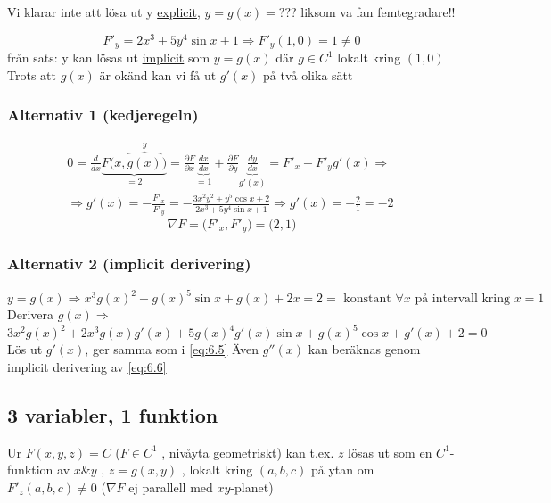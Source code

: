 \documentclass{article}
\begin{document}
Vi klarar inte att lösa ut y \underline{explicit}, \(y = g(x) = ???\) liksom va fan femtegradare!!

\[F'_y = 2x^3 + 5y^4\sin{x} + 1 \Rightarrow F'_y(1,0) = 1 \neq 0\]
från sats: y kan lösas ut \underline{implicit} som \(y = g(x)\) där \(g \in C^1\) lokalt kring \((1,0)\)
Trots att \(g(x)\) är okänd kan vi få ut \(g'(x)\) på två olika sätt

\subsubsection*{Alternativ 1 (kedjeregeln)}
\begin{equation}\label{eq:6.5}
\begin{split}
	0 = \frac{d}{dx} \underbrace{F\Big(x,\overbrace{g(x)}^y\Big)}_{=2} = \frac{\partial F}{\partial x} \underbrace{\frac{dx}{dx}}_{=1} + \frac{\partial F}{\partial y} \underbrace{\frac{dy}{dx}}_{g'(x)} = F'_x + F'_yg'(x)  \Rightarrow \\
	\Rightarrow g'(x) = - \frac{F'_x}{F'_y} = - \frac{3x^2y^2 + y^5\cos{x} + 2}{2x^3 + 5y^4\sin{x} + 1} \Rightarrow g'(x) = - \frac{2}{1} = -2 \
\end{split}
\end{equation}
\[\nabla F = \Big( F'_x,F'_y \Big) = \Big(2,1\Big)\]

\subsubsection*{Alternativ 2 (implicit derivering)}
\[
	y = g(x) \Rightarrow x^3g(x)^2 + g(x)^5\sin{x} + g(x) + 2x = 2 = \text{ konstant } \forall x \text{ på intervall kring } x = 1
\]
Derivera \(g(x) \Rightarrow\)
\begin{equation} \label{eq:6.6}
	3x^2g(x)^2 + 2x^3g(x)g'(x) + 5g(x)^4g'(x)\sin{x} + g(x)^5\cos{x} + g'(x) + 2 = 0 
\end{equation}
Lös ut \(g'(x)\), ger samma som i \eqref{eq:6.5} Även \(g''(x)\) kan beräknas genom implicit derivering av \eqref{eq:6.6}

\subsection{3 variabler, 1 funktion}

Ur \(F(x,y,z) = C\) \Big(\(F \in C^1\) , nivåyta geometriskt\Big) kan t.ex. \(z\) lösas ut som en \(C^1\)-funktion av \(x \& y\) , \(z = g(x,y)\) , 
lokalt kring \((a,b,c)\) på ytan om \(F'_z(a,b,c) \neq 0\) \Big(\(\nabla F\) ej parallell med \(xy\)-planet\Big)
\end{document}
